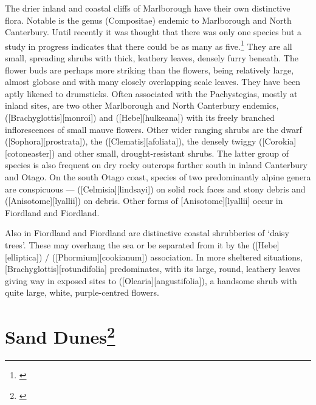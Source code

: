 The drier inland and coastal cliffs of Marlborough have their own distinctive flora.
Notable is the genus  (Compositae) endemic to Marlborough and North Canterbury.
Until recently it was thought that there was only one species but a study in progress indicates that there could be as many as five.\footnote{\cite{molloy1980taxonomy}}
They are all small, spreading shrubs with thick, leathery leaves, densely furry beneath.
The flower buds are perhaps more striking than the flowers, being relatively large, almost globose and with many closely overlapping scale leaves.
They have been aptly likened to drumsticks.
Often associated with the Pachystegias, mostly at inland sites, are two other Marlborough and North Canterbury endemics,  ([Brachyglottis][monroi]) and  ([Hebe][hulkeana]) with its freely branched inflorescences of small mauve flowers.
Other wider ranging shrubs are the dwarf  ([Sophora][prostrata]), the  ([Clematis][afoliata]), the densely twiggy  ([Corokia][cotoneaster]) and other small, drought-resistant shrubs.
The latter group of species is also frequent on dry rocky outcrops further south in inland Canterbury and Otago.
On the south Otago coast, species of two predominantly alpine genera are conspicuous ---  ([Celmisia][lindsayi]) on solid rock faces and stony debris and  ([Anisotome][lyallii]) on debris.
Other forms of [Anisotome][lyallii] occur in Fiordland and Fiordland.

Also in Fiordland and Fiordland are distinctive coastal shrubberies of `daisy trees'.
These may overhang the sea or be separated from it by the  ([Hebe][elliptica]) /  ([Phormium][cookianum]) association.
In more sheltered situations, [Brachyglottis][rotundifolia] predominates, with its large, round, leathery leaves giving way in exposed sites to  ([Olearia][angustifolia]), a handsome shrub with quite large, white, purple-centred flowers.

\section[Sand Dunes]{Sand Dunes\thinspace\footnote{\cite{moore1963plants}}}

